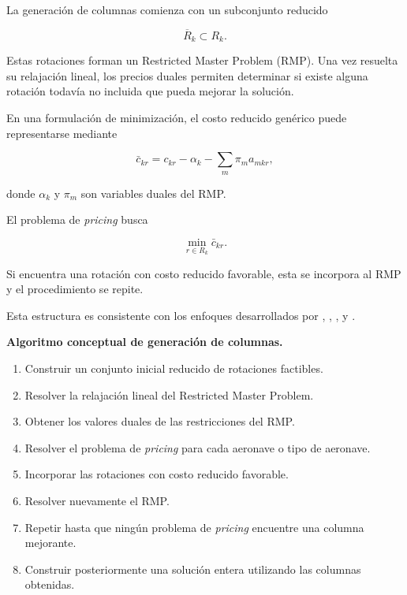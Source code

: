 La generación de columnas comienza con un subconjunto reducido

\[
\overline{R}_k\subset R_k.
\]

Estas rotaciones forman un Restricted Master Problem (RMP). Una vez resuelta su relajación
lineal, los precios duales permiten determinar si existe alguna rotación todavía no incluida
que pueda mejorar la solución.

En una formulación de minimización, el costo reducido genérico puede representarse mediante

\begin{equation}
\bar c_{kr}
=
c_{kr}
-
\alpha_k
-
\sum_m\pi_m a_{mkr},
\label{eq:reduced_cost}
\end{equation}

donde $\alpha_k$ y $\pi_m$ son variables duales del RMP.

El problema de \textit{pricing} busca

\begin{equation}
\min_{r\in R_k}\bar c_{kr}.
\label{eq:pricing}
\end{equation}

Si encuentra una rotación con costo reducido favorable, esta se incorpora al RMP y el
procedimiento se repite.

Esta estructura es consistente con los enfoques desarrollados por
, ,
,  y
.


\vspace{0.5em}
\noindent\textbf{Algoritmo conceptual de generación de columnas.}

\begin{enumerate}

    \item Construir un conjunto inicial reducido de rotaciones factibles.

    \item Resolver la relajación lineal del Restricted Master Problem.

    \item Obtener los valores duales de las restricciones del RMP.

    \item Resolver el problema de \textit{pricing} para cada aeronave o tipo de aeronave.

    \item Incorporar las rotaciones con costo reducido favorable.

    \item Resolver nuevamente el RMP.

    \item Repetir hasta que ningún problema de \textit{pricing} encuentre una columna
    mejorante.

    \item Construir posteriormente una solución entera utilizando las columnas obtenidas.

\end{enumerate}


